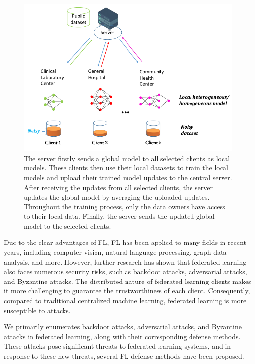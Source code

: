 \documentclass[conference]{IEEEtran}
\begin{document}
\begin{figure}[htbp]
    \centerline{\includegraphics[width=0.8\linewidth,height=0.6\linewidth]{picture/f1.png}}
    \caption{The server firstly sends a global model to all selected clients as local models. 
    These clients then use their local datasets to train the 
    local models and upload their trained model updates to the central server.
    After receiving the updates from all selected clients, 
    the server updates the global model by averaging the uploaded updates. 
    Throughout the training process, only the data owners 
    have access to their local data. Finally, the server sends the updated global model to the selected clients.}
    \label{fig1}
\end{figure}


Due to the clear advantages of FL, 
FL has been applied to many fields in recent years, 
including computer vision\cite{b5,b6}, natural language processing\cite{b7,b8}, 
graph data analysis\cite{b9,b10}, and more.
However, further research has shown that federated learning 
also faces numerous security risks, 
such as backdoor attacks, adversarial attacks, and Byzantine attacks. 
The distributed nature of federated learning clients 
makes it more challenging to guarantee 
the trustworthiness of each client. 
Consequently, compared to traditional centralized machine learning, 
federated learning is more susceptible to attacks.

We primarily enumerates backdoor attacks, adversarial attacks, 
and Byzantine attacks in federated learning, 
along with their corresponding defense methods. 
These attacks pose significant threats to federated learning systems, 
and in response to these new threats, several FL defense methods have been proposed.
\end{document}
